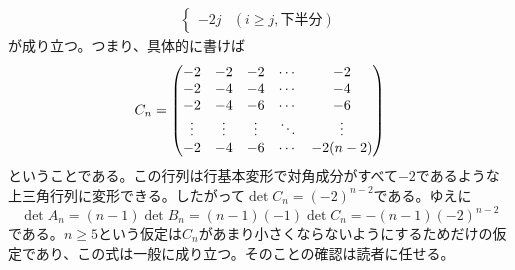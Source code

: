 \begin{sol}
\begin{align*}
\begin{cases}
   - 2j &(i \geq j, \text{下半分} )
  \end{cases}
  \end{align*}
  が成り立つ。つまり、具体的に書けば
  \[
  C_n = \begin{pmatrix} 
  -2 & -2 & -2 & \cdots & -2 \\
  -2 & -4 & -4 & \cdots & -4 \\
  -2 & -4 & -6 & \cdots & -6 \\
  \vdots & \vdots & \vdots & \ddots & \vdots \\
 -2 & -4 & -6 & \cdots & -2(n-2)
   \end{pmatrix}
  \]
  ということである。この行列は行基本変形で対角成分がすべて$-2$であるような上三角行列に変形できる。したがって$\det C_n = (-2)^{n-2}$である。ゆえに
  \[
  \det A_n = (n-1) \det B_n = (n-1)(-1) \det C_n = - (n-1) (-2)^{n-2}
  \]
  である。$n \geq 5$という仮定は$C_n$があまり小さくならないようにするためだけの仮定であり、この式は一般に成り立つ。そのことの確認は読者に任せる。
\end{sol}
